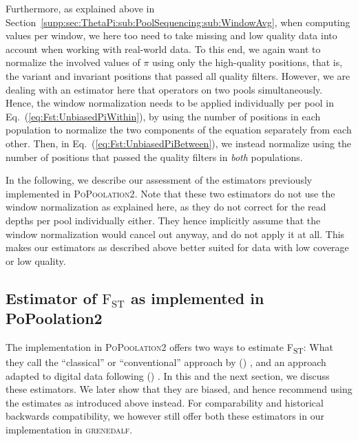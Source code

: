 \documentclass[letterpaper,fontsize=9pt,DIV=12]{scrartcl}
\newcommand\citeay[1]{\citeauthor{#1} (\citeyear{#1}) \cite{#1}}
\newcommand\toolname{\textsc}
\newcommand\eqnref[1]{Eq.~(\ref{#1})}
\newcommand\secref[1]{Section~\ref{#1}}
\newcommand{\fst}{F\textsubscript{ST}}
\begin{document}
Furthermore, as explained above in \secref{supp:sec:ThetaPi:sub:PoolSequencing:sub:WindowAvg}, when computing values per window, we here too need to take missing and low quality data into account when working with real-world data. To this end, we again want to normalize the involved values of $\pi$ using only the high-quality positions, that is, the variant and invariant positions that passed all quality filters. However, we are dealing with an estimator here that operators on two pools simultaneously. Hence, the window normalization needs to be applied individually per pool in \eqnref{eq:Fst:UnbiasedPiWithin}, by using the number of positions in each population to normalize the two components of the equation separately from each other. Then, in \eqnref{eq:Fst:UnbiasedPiBetween}, we instead normalize using the number of positions that passed the quality filters in \emph{both} populations.

In the following, we describe our assessment of the estimators previously implemented in \toolname{PoPoolation2}. Note that these two estimators do not use the window normalization as explained here, as they do not correct for the read depths per pool individually either. They hence implicitly assume that the window normalization would cancel out anyway, and do not apply it at all. This makes our estimators as described above better suited for data with low coverage or low quality.


\subsection{Estimator of \texorpdfstring{$\text{F}_\text{ST}$}{FST} as implemented in PoPoolation2}
\label{supp:sec:FST:sub:PoPoolation2Estimator}

The implementation in \toolname{PoPoolation2} \cite{Kofler2011b} offers two ways to estimate \fst{}:
What they call the ``classical'' or ``conventional'' approach by \citeay{Hartl2007}, and an approach adapted to digital data following \citeay{Karlsson2007}.
In this and the next section, we discuss these estimators.
We later show that they are biased, and hence recommend using the estimates as introduced above instead.
For comparability and historical backwards compatibility, we however still offer both these estimators in our implementation in \toolname{grenedalf}.
\end{document}
